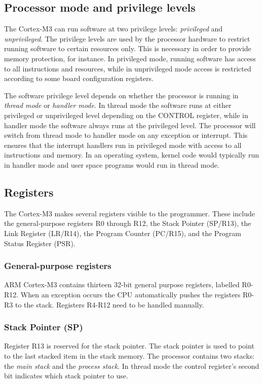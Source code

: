 \subsection{Processor mode and privilege levels}
The Cortex-M3 can run software at two privilege levels: \emph{privileged} and \emph{unprivileged}. The privilege levels are used by the processor hardware to restrict running software to certain resources only. This is necessary in order to provide memory protection, for instance. In privileged mode, running software has access to all instructions and resources, while in unprivileged mode access is restricted according to some board configuration registers.

The software privilege level depends on whether the processor is running in \emph{thread mode} or \emph{handler mode}. In thread mode the software runs at either privileged or unprivileged level depending on the CONTROL register, while in handler mode the software always runs at the privileged level. The processor will switch from thread mode to handler mode on any exception or interrupt. This ensures that the interrupt handlers run in privileged mode with access to all instructions and memory. In an operating system, kernel code would typically run in handler mode and user space programs would run in thread mode.\cite{CortexM3-RM}

\subsection{Registers}
The Cortex-M3 makes several registers visible to the programmer. These include the general-purpose registers R0 through R12, the Stack Pointer (SP/R13), the Link Register (LR/R14), the Program Counter (PC/R15), and the Program Status Register (PSR). 

\subsubsection{General-purpose registers}
ARM Cortex-M3 contains thirteen 32-bit general purpose registers, labelled R0-R12. When an exception occurs the CPU automatically pushes the registers R0-R3 to the stack. Registers R4-R12 need to be handled manually.

\subsubsection{Stack Pointer (SP)}
Register R13 is reserved for the stack pointer. The stack pointer is used to point to the last stacked item in the stack memory. The processor contains two stacks: the \emph{main stack} and the \emph{process stack}. In thread mode the control register's second bit indicates which stack pointer to use.

